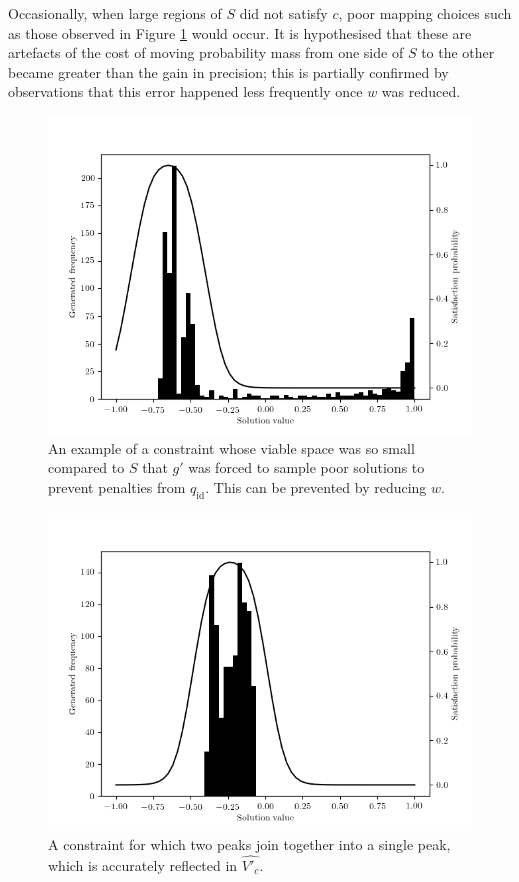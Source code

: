 \documentclass[../../main.tex]{subfiles}
\begin{document}
Occasionally, when large regions of $S$ did not satisfy $c$, poor mapping choices such as those observed in Figure \ref{fig:embeddedConstraintTooSparse} would occur.
It is hypothesised that these are artefacts of the cost of moving probability mass from one side of $S$ to the other became greater than the gain in precision; this is partially confirmed by observations that this error happened less frequently once $w$ was reduced.
\begin{figure}[H]
    \begin{center}
    \includegraphics[width=\textwidth]{embeddedConstraint4}
    \caption{
        An example of a constraint whose viable space was so small compared to $S$ that $g'$ was forced to sample poor solutions to prevent penalties from $q_\text{id}$.
        This can be prevented by reducing $w$.
    }
    \label{fig:embeddedConstraintTooSparse}
    \end{center}
\end{figure}
\begin{figure}[H]
    \begin{center}
    \includegraphics[width=\textwidth]{embeddedConstraint7}
    \caption{
        A constraint for which two peaks join together into a single peak, which is accurately reflected in $\hat{V'_c}$.
    }
    \label{fig:embeddedConstraintJoinedModes}
    \end{center}
\end{figure}
\end{document}
